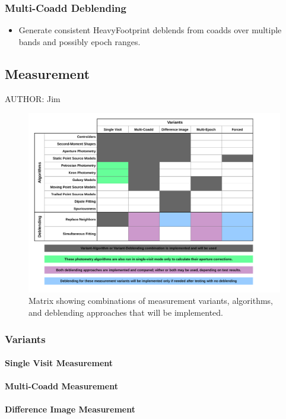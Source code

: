 \subsubsection{Multi-Coadd Deblending}
\begin{itemize}
\item Generate consistent HeavyFootprint deblends from coadds over multiple bands and possibly epoch ranges.
\end{itemize}

\subsection{Measurement}
AUTHOR: Jim

\begin{figure}
\centering
\includegraphics[width=\textwidth]{figures/measurement-matrix.pdf}
\caption{Matrix showing combinations of measurement variants, algorithms, and deblending approaches that will be implemented.
\label{fig:measurement-matrix}}
\end{figure}

\subsubsection{Variants}
\paragraph{Single Visit Measurement}
\paragraph{Multi-Coadd Measurement}
\paragraph{Difference Image Measurement}
